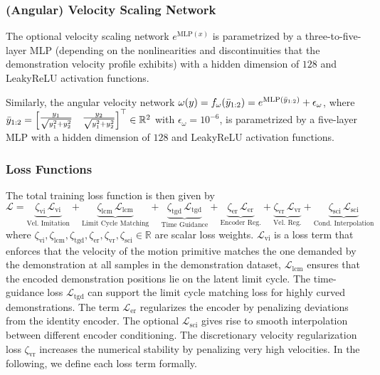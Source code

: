 \subsubsection{(Angular) Velocity Scaling Network}
The optional velocity scaling network $e^{\mathrm{MLP}(x)}$ is parametrized by a three-to-five-layer MLP (depending on the nonlinearities and discontinuities that the demonstration velocity profile exhibits) with a hidden dimension of $128$ and LeakyReLU activation functions.

Similarly, the angular velocity network $\omega(y) = f_\omega(\Bar{y}_{1:2}) = e^{\mathrm{MLP}(\Bar{y}_{1:2})} + \epsilon_\omega$, where $\Bar{y}_{1:2} = \begin{bmatrix}
    \frac{y_1}{\sqrt{y_1^2+y_2^2}} &  \frac{y_2}{\sqrt{y_1^2+y_2^2}}
\end{bmatrix}^\top \in \mathbb{R}^2$ with $\epsilon_\omega = 10^{-6}$, is parametrized by a five-layer MLP with a hidden dimension of $128$ and LeakyReLU activation functions.

\subsubsection{Loss Functions}
The total training loss function is then given by
\begin{equation}
    \mathcal{L} = \underbrace{\zeta_\mathrm{vi} \, \mathcal{L}_\mathrm{vi}}_\text{Vel. Imitation} + \underbrace{\zeta_\mathrm{lcm} \, \mathcal{L}_\mathrm{lcm}}_\text{Limit Cycle Matching} + \underbrace{\zeta_\mathrm{tgd} \, \mathcal{L}_\mathrm{tgd}}_\text{Time Guidance} 
    + \underbrace{\zeta_\mathrm{er} \, \mathcal{L}_{\mathrm{er}}}_\text{Encoder Reg.}
    + \underbrace{\zeta_\mathrm{vr} \, \mathcal{L}_{\mathrm{vr}}}_\text{Vel. Reg.}  + \underbrace{\zeta_\mathrm{sci} \, \mathcal{L}_{\mathrm{sci}}}_\text{Cond. Interpolation} 
\end{equation}
where $\zeta_\mathrm{vi}, \zeta_\mathrm{lcm}, \zeta_\mathrm{tgd}, \zeta_\mathrm{er}, \zeta_\mathrm{vr}, \zeta_\mathrm{sci} \in \mathbb{R}$ are scalar loss weights.
$\mathcal{L}_\mathrm{vi}$ is a loss term that enforces that the velocity of the motion primitive matches the one demanded by the demonstration at all samples in the demonstration dataset, $\mathcal{L}_\mathrm{lcm}$ ensures that the encoded demonstration positions lie on the latent limit cycle. The time-guidance loss $\mathcal{L}_\mathrm{tgd}$ can support the limit cycle matching loss for highly curved demonstrations. 
The term $\mathcal{L}_\mathrm{er}$ regularizes the encoder by penalizing deviations from the identity encoder.
The optional $\mathcal{L}_{\mathrm{sci}}$ gives rise to smooth interpolation between different encoder conditioning.
The discretionary velocity regularization loss $\zeta_\mathrm{vr}$ increases the numerical stability by penalizing very high velocities. In the following, we define each loss term formally.

